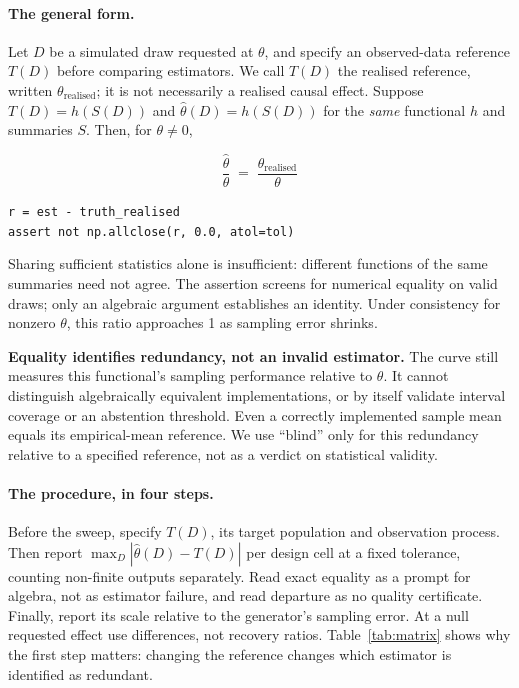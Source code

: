 \paragraph{The general form.} Let $D$ be a simulated draw requested at
$\theta$, and specify an observed-data reference $T(D)$ before comparing
estimators. We call $T(D)$ the realised reference, written
$\theta_{\text{realised}}$; it is not necessarily a realised causal effect.
Suppose $T(D)=h(S(D))$ and $\hat\theta(D)=h(S(D))$ for the \emph{same}
functional $h$ and summaries $S$. Then, for $\theta\ne0$,
\begin{mdframed}[linewidth=0.5pt,innertopmargin=4pt,innerbottommargin=4pt,%
  nobreak=true]
\[
\frac{\hat\theta}{\theta} \;=\; \frac{\theta_{\text{realised}}}{\theta}
\]
\begin{center}
\texttt{r = est - truth\_realised}\\
\texttt{assert not np.allclose(r, 0.0, atol=tol)}
\end{center}
\end{mdframed}
Sharing sufficient statistics alone is insufficient: different functions of the
same summaries need not agree. The assertion screens for numerical equality on
valid draws; only an algebraic argument establishes an identity. Under
consistency for nonzero $\theta$, this ratio approaches 1 as sampling error
shrinks.

\textbf{Equality identifies redundancy, not an invalid estimator.} The curve
still measures this functional's sampling performance relative to $\theta$.
It cannot distinguish algebraically equivalent implementations, or by itself
validate interval coverage or an abstention threshold. Even a correctly
implemented sample mean equals its empirical-mean reference. We use ``blind''
only for this redundancy relative to a specified reference, not as a verdict
on statistical validity.

\paragraph{The procedure, in four steps.} Before the sweep, specify $T(D)$,
its target population and observation process. Then report
$\max_D|\hat\theta(D)-T(D)|$ per design cell at a fixed tolerance, counting
non-finite outputs separately. Read exact equality as a prompt for algebra, not
as estimator failure, and read departure as no quality certificate. Finally,
report its scale relative to the generator's sampling error. At a null requested
effect use differences, not recovery ratios. Table~\ref{tab:matrix} shows why
the first step matters: changing the reference changes which estimator is
identified as redundant.

